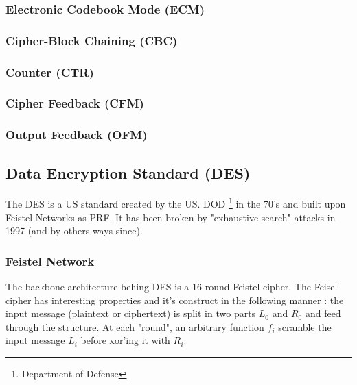 \subsubsection{ Electronic Codebook Mode (ECM) } 

\subsubsection{ Cipher-Block Chaining (CBC) }

\subsubsection{ Counter (CTR) }

\subsubsection{ Cipher Feedback (CFM) }

\subsubsection{ Output Feedback (OFM) }


\subsection{Data Encryption Standard (DES)}

The DES is a US standard created by the US. DOD \footnote{Department of Defense} in the 70's and built upon Feistel Networks as PRF. It has been broken by "exhaustive search" attacks in 1997 (and by others ways since).

\subsubsection{Feistel Network}

The backbone architecture behing DES is a 16-round Feistel cipher. The Feisel cipher has interesting properties and it's construct in the following manner : the input message (plaintext or ciphertext) is split in two parts $L_0$ and $R_0$ and feed through the structure. At each "round", an arbitrary function $f_i$ scramble the input message $L_i$ before xor'ing it with $R_i$.

